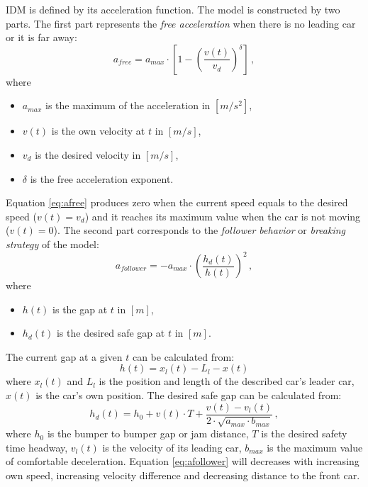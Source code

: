\documentclass[a4paper,11pt,twoside]{report}
\begin{document}
			IDM is defined by its acceleration function. The model is constructed by two parts. The first part represents the \textit{free acceleration} when there is no leading car or it is far away:
			\begin{equation}
				a_{free}=a_{max}\cdot \left [ 1 - \left ( \frac{v(t)}{v_d} \right )^\delta \right ]\,,
				\label{eq:afree}
			\end{equation}
			where
			\begin{itemize}
				\item $a_{max}$ is the maximum of the acceleration in $[m/s^2]$,
				\item $v(t)$ is the own velocity at $t$ in $[m/s]$,
				\item $v_d$ is the desired velocity in $[m/s]$,
				\item $\delta$ is the free acceleration exponent.
			\end{itemize}
			Equation \ref{eq:afree} produces zero when the current speed equals to the desired speed ($v(t)=v_d$) and it reaches its maximum value when the car is not moving ($v(t)=0$).
			The second part corresponds to the \textit{follower behavior} or \textit{breaking strategy} of the model:
			\begin{equation}
				a_{follower}=-a_{max}\cdot \left ( \frac{h_d(t)}{h(t)} \right )^2\,,
				\label{eq:afollower}
			\end{equation}
			where
			\begin{itemize}
				\item $h(t)$ is the gap at $t$ in $[m]$,
				\item $h_d(t)$ is the desired safe gap at $t$ in $[m]$.
			\end{itemize}
			The current gap at a given $t$ can be calculated from:
			$$
				h(t)=x_l(t)-L_l - x(t)
			$$
			where $x_l(t)$ and $L_l$ is the position and length of the described car's leader car, $x(t)$ is the car's own position.
			The desired safe gap can be calculated from:
			$$
				h_d(t)=h_0 + v(t)\cdot T + \frac{v(t)-v_l(t)}{2\cdot \sqrt{a_{max}\cdot b_{max}}}\,,
			$$
			where $h_0$ is the bumper to bumper gap or jam distance, $T$ is the desired safety time headway, $v_l(t)$ is the velocity of its leading car, $b_{max}$ is the maximum value of comfortable deceleration.
			Equation \ref{eq:afollower} will decreases with increasing own speed, increasing velocity difference and decreasing distance to the front car.
\end{document}
